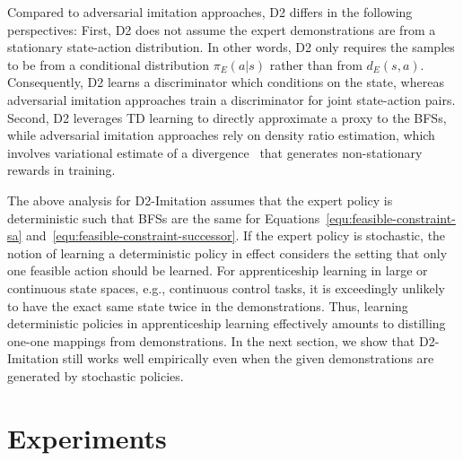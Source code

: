 \documentclass[letterpaper]{article} %
\begin{document}
Compared to adversarial imitation approaches, D2 differs in the following perspectives:
First, D2 does not assume the expert demonstrations are from a stationary state-action distribution.
In other words, D2 only requires the samples to be from a conditional distribution $\pi_E(a|s)$
rather than from $d_E(s, a)$.
Consequently, D2 learns a discriminator which conditions on the state,
whereas adversarial imitation approaches train a discriminator for joint state-action pairs.
Second, D2 leverages TD learning to directly approximate a proxy to the BFSs,
while adversarial imitation approaches rely on density ratio estimation, which involves variational estimate of a divergence~\cite{nguyen2010estimating} that generates non-stationary rewards in training.


The above analysis for D2-Imitation assumes that the expert policy is deterministic such that BFSs are the same for Equations~\eqref{equ:feasible-constraint-sa} and~\eqref{equ:feasible-constraint-successor}.
If the expert policy is stochastic,
the notion of learning a deterministic policy in effect considers the setting that only one feasible action should be learned.
For apprenticeship learning in large or continuous state spaces, e.g., continuous control tasks,
it is exceedingly unlikely to have the exact same state twice in the demonstrations.
Thus, learning deterministic policies in apprenticeship learning effectively amounts to distilling one-one mappings from demonstrations.
In the next section, we show that D2-Imitation still works well empirically even when the given demonstrations are generated by stochastic policies.


\section{Experiments}
\end{document}
